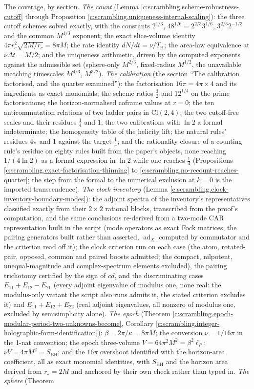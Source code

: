 \documentclass[11pt]{article}
\theoremstyle{definition}
\theoremstyle{plain}
\providecommand{\Cl}{}\renewcommand{\Cl}{\mathrm{Cl}}
\providecommand{\SBH}{}\renewcommand{\SBH}{S_{\mathrm{BH}}}
\providecommand{\TH}{}\renewcommand{\TH}{T_{\mathrm{H}}}
\providecommand{\lP}{}\renewcommand{\lP}{\ell_{P}}
\begin{document}
The coverage, by section. \emph{The count} (Lemma \ref{c:scrambling.scheme-robustness-cutoff} through Proposition \ref{c:scrambling.uniqueness-internal-scaling}): the three cutoff schemes solved exactly, with the constants $2^{1/3}$, $48^{1/6} = 2^{2/3}3^{1/6}$, $3^{2/3}2^{-1/3}$ and the common $M^{1/3}$ exponent; the exact slice-volume identity $4\pi r_c^2\sqrt{2M/r_c} = 8\pi M$; the rate identity $dN/dt = \nu/\TH$; the area-law equivalence at $\nu\Delta t = M/2$; and the uniqueness arithmetic, driven by the computed exponents against the admissible set (sphere-only $M^{2/3}$, fixed-radius $M^{1/2}$, the unavailable matching timescales $M^{4/3}$, $M^{3/2}$). \emph{The calibration} (the section ``The calibration factorised, and the quarter examined''): the factorisation $16\pi = 4\pi \times 4$ and its ingredients as exact monomials; the scheme ratios $\tfrac32$ and $12^{1/4}$ on the prime factorisations; the horizon-normalised coframe values at $r = 0$; the ten anticommutation relations of two ladder pairs in $\Cl(2,4)$; the two cutoff-free scales and their residues $\tfrac14$ and $1$; the two calibrations with $\ln 2$ a formal indeterminate; the homogeneity table of the helicity lift; the natural rules' residues $4\pi$ and $1$ against the target $\tfrac14$; and the rationality closure of a counting rule's residue on eighty rules built from the paper's objects, none reaching $1/(4\ln 2)$ as a formal expression in $\ln 2$ while one reaches $\tfrac14$ (Propositions \ref{c:scrambling.exact-factorisation-thinning} to \ref{c:scrambling.no-recount-reaches-quarter}; the step from the formal to the numerical exclusion at $k = 0$ is the imported transcendence). \emph{The clock inventory} (Lemma \ref{c:scrambling.clock-inventory-boundary-modes}): the adjoint spectra of the inventory's representatives classified exactly from their $2\times2$ rational blocks, transcribed from the proof's computation, and the same conclusions re-derived from a two-mode CAR representation built in the script (mode operators as exact Fock matrices, the pairing generators built rather than asserted, $\operatorname{ad}_X$ computed by commutator and the criterion read off it); the clock criterion run on each case (the atom, rotated-pair, opposed, common and paired boosts admitted; the compact, nilpotent, unequal-magnitude and complex-spectrum elements excluded), the pairing trichotomy certified by the sign of $cd$, and the discriminating cases $E_{11} + E_{12} - E_{21}$ (every adjoint eigenvalue of modulus one, none real: the modulus-only variant the script also runs admits it, the stated criterion excludes it) and $E_{11} + E_{12} + E_{22}$ (real adjoint eigenvalues, all nonzero of modulus one, excluded by semisimplicity alone). \emph{The epoch} (Theorem \ref{c:scrambling.epoch-modular-period-two-unknowns-become}, Corollary \ref{c:scrambling.integer-holographic-form-identification}): $\beta = 2\pi/\kappa = 8\pi M$; the conversion $\nu = 1/16\pi$ in the 1-nat convention; the epoch three-volume $V = 64\pi^2M^2 = \beta^2\lP$; $\nu V = 4\pi M^2 = \SBH$; and the $16\pi$ overshoot identified with the horizon-area coefficient, all as exact monomial identities, with $\SBH$ and the horizon area derived from $r_s = 2M$ and anchored by their own check rather than typed in. \emph{The sphere} (Theorem 
\end{document}
